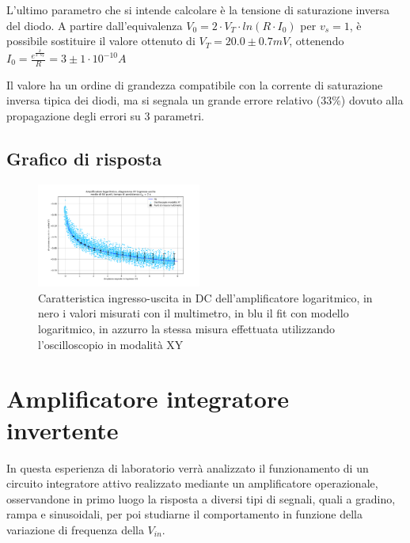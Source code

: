 \documentclass[journal]{IEEEtran}
\begin{document}
L'ultimo parametro che si intende calcolare è la tensione di saturazione inversa del diodo.
A partire dall'equivalenza $V_0 = 2 \cdot V_T \cdot ln(R \cdot I_0)$ per $v_s = 1$, è possibile sostituire il valore ottenuto di $V_T = 20.0 \pm 0.7 mV$, ottenendo
$I_0 = \frac{e^{\frac{k}{2 \cdot V_T}}}{R} = 3 \pm 1 \cdot 10^{-10} A$

Il valore ha un ordine di grandezza compatibile con la corrente di saturazione inversa tipica dei diodi, ma si segnala un grande errore relativo ($33 \% $) dovuto alla propagazione degli errori su 3 parametri.

\subsection{Grafico di risposta}

\begin{figure}[H]%
\begin {center}
\includegraphics[trim = {100px 0 0 0}, width=0.48\textwidth]{analysis/output/OPA-log-fitted.pdf}
\caption{Caratteristica ingresso-uscita in DC dell'amplificatore logaritmico, in nero i valori misurati con il multimetro, in blu il fit con modello logaritmico, in azzurro la stessa misura effettuata utilizzando l'oscilloscopio in modalità XY}
\label{fig:log_ampl_fit_xy}
\end {center}
\end{figure}


\section{\textbf{Amplificatore integratore invertente}} %
In questa esperienza di laboratorio verrà analizzato il funzionamento di un circuito integratore attivo realizzato mediante un amplificatore operazionale, osservandone in primo luogo la risposta a diversi tipi di segnali, quali a gradino, rampa e sinusoidali, per poi studiarne il comportamento in funzione della variazione di frequenza della $V_{in}$.
\end{document}
